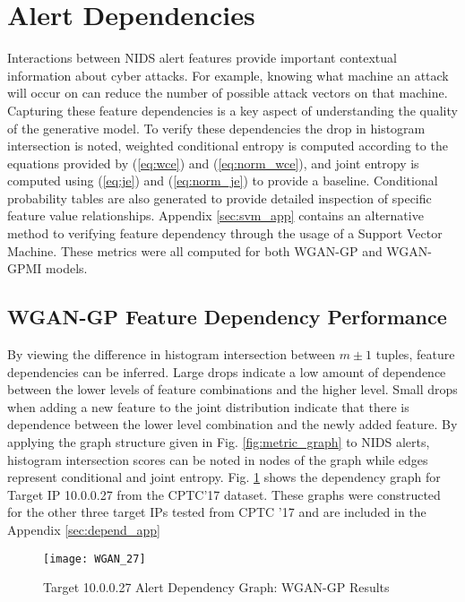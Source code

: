 \section{Alert Dependencies}
\label{sec:depend}

Interactions between NIDS alert features provide important contextual information about cyber attacks. For example, knowing what machine an attack will occur on can reduce the number of possible attack vectors on that machine. Capturing these feature dependencies is a key aspect of understanding the quality of the generative model. To verify these dependencies the drop in histogram intersection is noted, weighted conditional entropy is computed according to the equations provided by (\ref{eq:wce}) and (\ref{eq:norm_wce}), and joint entropy is computed using (\ref{eq:je}) and (\ref{eq:norm_je}) to provide a baseline. Conditional probability tables are also generated to provide detailed inspection of specific feature value relationships. Appendix \ref{sec:svm_app} contains an alternative method to verifying feature dependency through the usage of a Support Vector Machine. These metrics were all computed for both WGAN-GP and WGAN-GPMI models.

\subsection{WGAN-GP Feature Dependency Performance}

By viewing the difference in histogram intersection between $m\pm1$ tuples, feature dependencies can be inferred. Large drops indicate a low amount of dependence between the lower levels of feature combinations and the higher level. Small drops when adding a new feature to the joint distribution indicate that there is dependence between the lower level combination and the newly added feature. By applying the graph structure given in Fig. \ref{fig:metric_graph} to NIDS alerts, histogram intersection scores can be noted in nodes of the graph while edges represent conditional and joint entropy. Fig. \ref{fig:alert_depend_1} shows the dependency graph for Target IP 10.0.0.27 from the CPTC'17 dataset. These graphs were constructed for the other three target IPs tested from CPTC '17 and are included in the Appendix \ref{sec:depend_app}

\begin{figure}[!htbp]
	\centering
	\texttt{[image: WGAN\_27]}
	\caption{
		Target 10.0.0.27 Alert Dependency Graph: WGAN-GP Results
	}
	\label{fig:alert_depend_1}
\end{figure}

